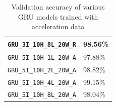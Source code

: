 \documentclass{article}
\begin{document}
\begin{table}[ht]
\begin{center}
\begin{tabular}{ |p{}|p{}| }
                \texttt{GRU\_3I\_10H\_8L\_20W\_R} & 98.56\%             \\
                \hline
                \texttt{GRU\_5I\_10H\_1L\_20W\_A} & 97.88\%             \\
                \hline
                \texttt{GRU\_5I\_10H\_2L\_20W\_A} & 98.82\%             \\
                \hline
                \texttt{GRU\_5I\_10H\_4L\_20W\_A} & 99.15\%             \\
                \hline
                \texttt{GRU\_5I\_10H\_8L\_20W\_A} & 98.04\%             \\
                \hline
            \end{tabular}
        \end{center}
        \caption{Validation accuracy of various GRU models trained with
        acceleration data}
        \label{tab:gru_model_validation_accuracy}
    \end{table}
\end{document}

